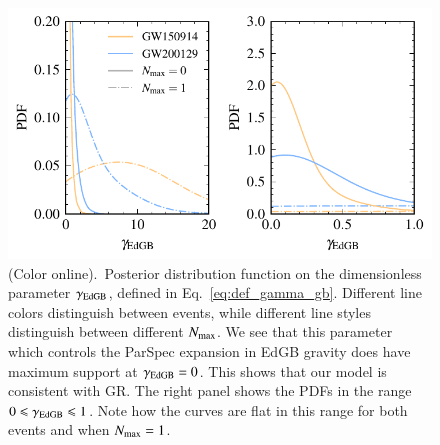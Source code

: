 \documentclass[twocolumn,
               prd,
               aps,
               superscriptaddress,
               tightenlines,
               nofootinbib,
               eqsecnum,
               amsfonts,
               amsmath,
               longbibliography]{revtex4-1}
\begin{document}
\begin{figure}[t]
\includegraphics[width=\columnwidth]{figs/edgb_gamma.pdf}
\caption{(Color online).~Posterior distribution function on the dimensionless parameter $\gamma_{\rm EdGB}$,
defined in Eq.~\eqref{eq:def_gamma_gb}. Different line colors distinguish between events, while
different line styles distinguish between different $N_{\rm max}$.
%
We see that this parameter which controls the ParSpec expansion in EdGB gravity
does have maximum support at $\gamma_{\rm EdGB} = 0$. This shows that our model is consistent with GR.
The right panel shows the PDFs in the range $0 \leqslant \gamma_{\rm EdGB} \leqslant 1$. Note how
the curves are flat in this range for both events and when $N_{\rm max} = 1$.}
\label{fig:gamma_gb}
\end{figure}
\end{document}
